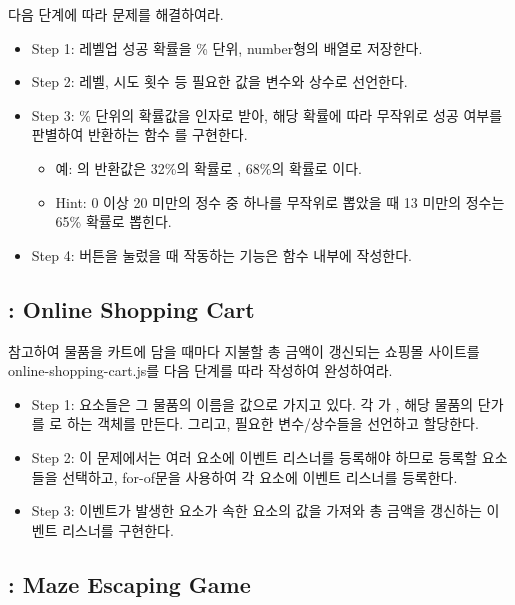 다음 단계에 따라 문제를 해결하여라.

\begin{itemize}
    \item Step 1: 레벨업 성공 확률을 \% 단위, number형의 배열로 저장한다.
    \item Step 2: 레벨, 시도 횟수 등 필요한 값을 변수와 상수로 선언한다.
    \item Step 3: \% 단위의 확률값을 인자로 받아, 해당 확률에 따라 무작위로 성공 여부를 판별하여 반환하는 함수 를 구현한다.
    \begin{itemize}
        \item 예: 의 반환값은 32\%의 확률로 , 68\%의 확률로 이다.
        \item Hint: 0 이상 20 미만의 정수 중 하나를 무작위로 뽑았을 때 13 미만의 정수는 65\% 확률로 뽑힌다.
    \end{itemize}
    \item Step 4: 버튼을 눌렀을 때 작동하는 기능은  함수 내부에 작성한다.
\end{itemize}
\clearpage

\subsection*{: Online Shopping Cart}

\을 참고하여 물품을 카트에 담을 때마다 지불할 총 금액이 갱신되는 쇼핑몰 사이트를 online-shopping-cart.js를 다음 단계를 따라 작성하여 완성하여라.

\begin{itemize}
    \item Step 1:  요소들은 그 물품의 이름을  값으로 가지고 있다. 각 가 , 해당 물품의 단가를 로 하는 객체를 만든다. 그리고, 필요한 변수/상수들을 선언하고 할당한다.
    \item Step 2: 이 문제에서는 여러 요소에 이벤트 리스너를 등록해야 하므로 등록할 요소들을 선택하고, for-of문을 사용하여 각 요소에 이벤트 리스너를 등록한다.
    \item Step 3: 이벤트가 발생한 요소가 속한  요소의  값을 가져와 총 금액을 갱신하는 이벤트 리스너를 구현한다.
\end{itemize}

\subsection*{: Maze Escaping Game}

